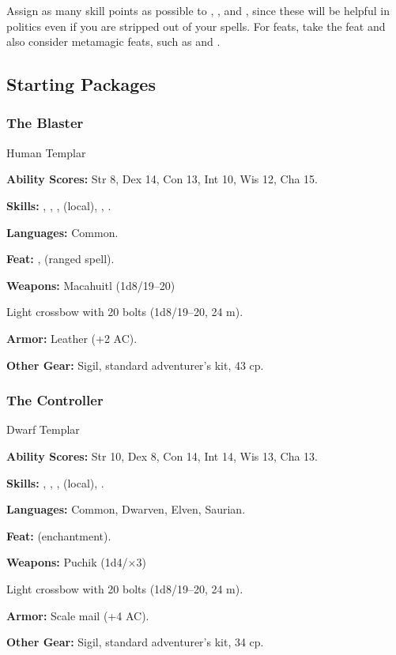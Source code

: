 Assign as many skill points as possible to , , and , since these will be helpful in politics even if you are stripped out of your spells. For feats, take the  feat and also consider metamagic feats, such as  and .


\vskip2cm
\subsection{Starting Packages}
\subsubsection{The Blaster}
Human Templar

\textbf{Ability Scores:} Str 8, Dex 14, Con 13, Int 10, Wis 12, Cha 15.

\textbf{Skills:} , , ,  (local), , .

\textbf{Languages:} Common.

\textbf{Feat:} ,  (ranged spell).

\textbf{Weapons:} Macahuitl (1d8/19--20)

Light crossbow with 20 bolts (1d8/19--20, 24 m).

\textbf{Armor:} Leather (+2 AC).

\textbf{Other Gear:} Sigil, standard adventurer's kit, 43 cp.

\subsubsection{The Controller}
Dwarf Templar

\textbf{Ability Scores:} Str 10, Dex 8, Con 14, Int 14, Wis 13, Cha 13.

\textbf{Skills:} , , ,  (local), .

\textbf{Languages:} Common, Dwarven, Elven, Saurian.

\textbf{Feat:}  (enchantment).

\textbf{Weapons:} Puchik (1d4/$\times$3)

Light crossbow with 20 bolts (1d8/19--20, 24 m).

\textbf{Armor:} Scale mail (+4 AC).

\textbf{Other Gear:} Sigil, standard adventurer's kit, 34 cp.


